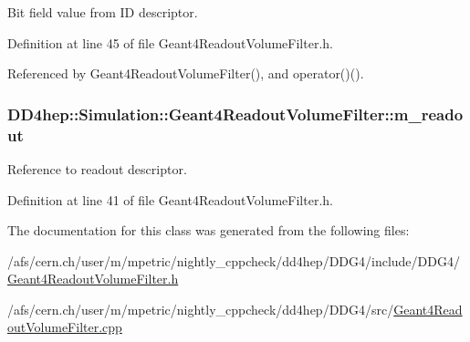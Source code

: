 Bit field value from ID descriptor. 

Definition at line 45 of file Geant4ReadoutVolumeFilter.h.

Referenced by Geant4ReadoutVolumeFilter(), and operator()().\hypertarget{class_d_d4hep_1_1_simulation_1_1_geant4_readout_volume_filter_a37eef102fa9c5ac1618be624129b61de}{
\subsubsection[{m\_\-readout}]{ {\bf DD4hep::Simulation::Geant4ReadoutVolumeFilter::m\_\-readout}}}
\label{class_d_d4hep_1_1_simulation_1_1_geant4_readout_volume_filter_a37eef102fa9c5ac1618be624129b61de}


Reference to readout descriptor. 

Definition at line 41 of file Geant4ReadoutVolumeFilter.h.

The documentation for this class was generated from the following files:\begin{DoxyCompactItemize}
\item 
/afs/cern.ch/user/m/mpetric/nightly\_\-cppcheck/dd4hep/DDG4/include/DDG4/\hyperlink{_geant4_readout_volume_filter_8h}{Geant4ReadoutVolumeFilter.h}\item 
/afs/cern.ch/user/m/mpetric/nightly\_\-cppcheck/dd4hep/DDG4/src/\hyperlink{_geant4_readout_volume_filter_8cpp}{Geant4ReadoutVolumeFilter.cpp}\end{DoxyCompactItemize}
